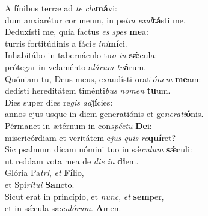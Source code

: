 \evenverse A fínibus terræ ad \textit{te} \textit{cla}\textbf{má}vi:~\*\\
\evenverse dum anxiarétur cor meum, in pe\textit{tra} \textit{e}\textit{xal}\textbf{tá}sti me.\\
\oddverse Deduxísti me, quia factus \textit{es} \textit{spes} \textbf{me}a:~\*\\
\oddverse turris fortitúdinis a fáci\textit{e} \textit{i}\textit{ni}\textbf{mí}ci.\\
\evenverse Inhabitábo in tabernáculo tu\textit{o} \textit{in} \textbf{sǽ}cula:~\*\\
\evenverse prótegar in velaménto a\textit{lá}\textit{rum} \textit{tu}\textbf{á}rum.\\
\oddverse Quóniam tu, Deus meus, exaudísti orati\textit{ó}\textit{nem} \textbf{me}am:~\*\\
\oddverse dedísti hereditátem timénti\textit{bus} \textit{no}\textit{men} \textbf{tu}um.\\
\evenverse Dies super dies re\textit{gis} \textit{ad}\textbf{jí}cies:~\*\\
\evenverse annos ejus usque in diem generatiónis et ge\textit{ne}\textit{ra}\textit{ti}\textbf{ó}nis.\\
\oddverse Pérmanet in ætérnum in con\textit{spé}\textit{ctu} \textbf{De}i:~\*\\
\oddverse misericórdiam et veritátem e\textit{jus} \textit{quis} \textit{re}\textbf{quí}ret?\\
\evenverse Sic psalmum dicam nómini tuo in sǽ\textit{cu}\textit{lum} \textbf{sǽ}culi:~\*\\
\evenverse ut reddam vota mea de \textit{di}\textit{e} \textit{in} \textbf{di}em.\\
\oddverse Glória Pa\textit{tri}, \textit{et} \textbf{Fí}lio,~\*\\
\oddverse et Spi\textit{rí}\textit{tu}\textit{i} \textbf{San}cto.\\
\evenverse Sicut erat in princípio, et \textit{nunc}, \textit{et} \textbf{sem}per,~\*\\
\evenverse et in sǽcula sæ\textit{cu}\textit{ló}\textit{rum}. \textbf{A}men.\\
